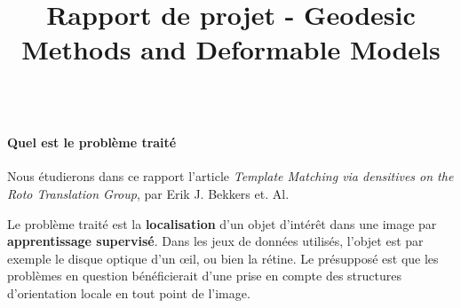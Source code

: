\documentclass{article}
\title{Rapport de projet - Geodesic Methods and Deformable Models}
\begin{document}
\maketitle
$ \quad $


\paragraph{Quel est le problème traité} 
Nous étudierons dans ce rapport l'article \emph{Template Matching via densitives on the
Roto Translation Group}, par Erik J. Bekkers et. Al.

Le problème traité est la \textbf{localisation} d'un objet d'intérêt dans une image par
\textbf{apprentissage supervisé}. Dans les jeux de
données utilisés, l'objet est par exemple le disque optique d'un œil, ou bien la
rétine. Le présupposé est que les problèmes en question bénéficierait d'une prise en
compte des structures d'orientation locale en tout point de l'image.
\end{document}
